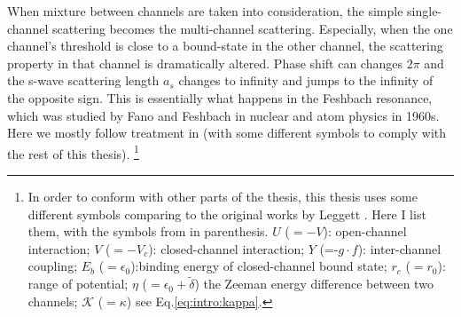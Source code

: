 When mixture between channels are taken into consideration, the simple single-channel scattering becomes the multi-channel scattering.  Especially, when the one channel's threshold is close to a bound-state in the other channel, the scattering property in that channel is dramatically altered.  Phase shift can changes $2\pi$ and the s-wave scattering length $a_{s}$ changes to infinity and jumps to the infinity of the opposite sign.  This is essentially what happens in the Feshbach resonance, which was studied by Fano\cite{Fano} and Feshbach \cite{nuclear}  in nuclear and atom physics in 1960s.  Here we  mostly follow treatment in \cite{Leggett} (with some different symbols to comply with the rest of this thesis). 
\footnote{In order to conform with other parts of the thesis, this thesis uses some different symbols comparing to the original works by Leggett \cite{Leggett}.  Here I list them, with the symbols from \cite{Leggett} in parenthesis.  $U$ ($=-V$): open-channel interaction; $V$ ($=-V_{c}$): closed-channel interaction; $Y$ (=-$g\cdot{}f$): inter-channel coupling; $E_{b}$ ($=\epsilon_{0}$):binding energy of closed-channel bound state; $r_{c}$ ($=r_{0}$): range of potential; $\eta$ ($=\epsilon_0+\tilde\delta$) the Zeeman energy difference between two channels; $\mathcal{K}$ ($=\kappa$) see Eq.\ref{eq:intro:kappa}.}

